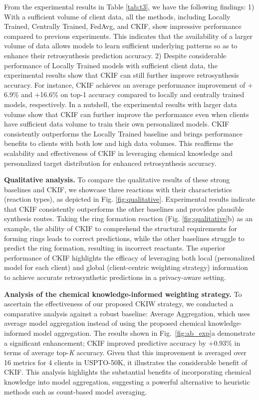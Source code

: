 From the experimental results in Table \ref{tab:t3}, we have the following findings: 1) With a sufficient volume of client data, all the methods, including Locally Trained, Centrally Trained, FedAvg, and CKIF, show impressive performance compared to previous experiments. This indicates that the availability of a larger volume of data allows models to learn sufficient underlying patterns so as to enhance their retrosynthesis prediction accuracy. 2) Despite considerable performance of Locally Trained models with sufficient client data, the experimental results show that CKIF can still further improve retrosynthesis accuracy. For instance, CKIF achieves an average performance improvement of $+$6.9\% and $+$16.6\% on top-1 accuracy compared to locally and centrally trained models, respectively. In a nutshell, the experimental results with larger data volume show that CKIF can further improve the performance even when clients have sufficient data volume to train their own personalized models. CKIF consistently outperforms the Locally Trained baseline and brings performance benefits to clients with both low and high data volumes. This reaffirms the scalability and effectiveness of CKIF in leveraging chemical knowledge and personalized target distribution for enhanced retrosynthesis accuracy.





\noindent\textbf{Qualitative analysis.}  
To compare the qualitative results of these strong baselines and CKIF, we showcase three reactions with their characteristics (reaction types), as depicted in Fig. \ref{fig:qualitative}. Experimental results indicate that CKIF consistently outperforms the other baselines and provides plausible synthesis routes. Taking the ring formation reaction (Fig. \ref{fig:qualitative}b) as an example, the ability of CKIF to comprehend the structural requirements for forming rings leads to correct predictions, while the other baselines struggle to predict the ring formation, resulting in incorrect reactants. The superior performance of CKIF highlights the efficacy of leveraging both local (personalized model for each client) and global (client-centric weighting strategy) information to achieve accurate retrosynthetic predictions in a privacy-aware setting.



\noindent\textbf{Analysis of the chemical knowledge-informed weighting strategy.}  
To ascertain the effectiveness of our proposed CKIW strategy, we conducted a comparative analysis against a robust baseline: Average Aggregation, which uses average model aggregation instead of using the proposed chemical knowledge-informed model aggregation. The results shown in Fig.~\ref{fig:ab_exp}a demonstrate a significant enhancement; CKIF improved predictive accuracy by $+$0.93\% in terms of average top-\textit{K} accuracy. Given that this improvement is averaged over 16 metrics for 4 clients in USPTO-50K, it illustrates the considerable benefit of CKIF. This analysis highlights the substantial benefits of incorporating chemical knowledge into model aggregation, suggesting a powerful alternative to heuristic methods such as count-based model averaging.


